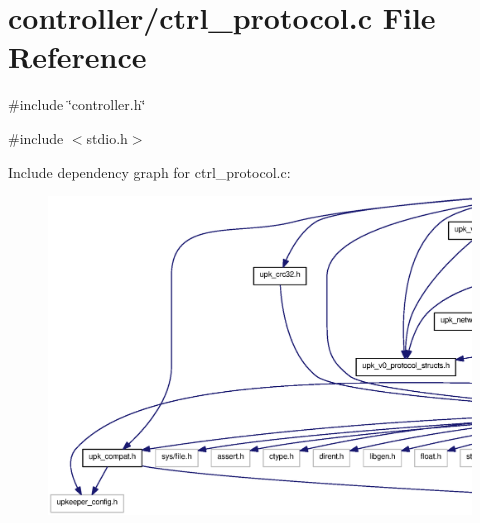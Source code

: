 \section{controller/ctrl\_\-protocol.c File Reference}
\label{ctrl__protocol_8c}
{\ttfamily \#include \char`\"{}controller.h\char`\"{}}\par
{\ttfamily \#include $<$stdio.h$>$}\par
Include dependency graph for ctrl\_\-protocol.c:\nopagebreak
\begin{figure}[H]
\begin{center}
\leavevmode
\includegraphics[width=400pt]{ctrl__protocol_8c__incl}
\end{center}
\end{figure}
